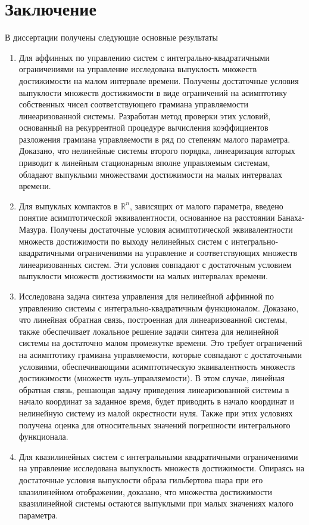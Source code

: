 \documentclass[../main.tex]{subfiles}
\begin{document}
\clearpage
\section*{Заключение}
В диссертации получены следующие основные результаты
\begin{enumerate}
	\item Для аффинных по управлению систем с интегрально-квадратичными ограничениями на управление исследована выпуклость множеств достижимости на малом интервале времени.
	Получены достаточные условия выпуклости множеств достижимости в виде ограничений на асимптотику собственных чисел соответствующего грамиана управляемости линеаризованной системы.
	Разработан метод проверки этих условий, основанный на рекуррентной процедуре вычисления коэффициентов разложения грамиана управляемости в ряд по степеням малого параметра.
	Доказано, что нелинейные системы второго порядка, линеаризация которых приводит к линейным стационарным вполне управляемым системам, обладают выпуклыми множествами достижимости на малых интервалах времени.
	
	\item Для выпуклых компактов в $\mathbb{R}^n$, зависящих от малого параметра, введено понятие асимптотической эквивалентности, основанное на расстоянии Банаха-Мазура.
	Получены достаточные условия асимптотической эквивалентности множеств достижимости по выходу нелинейных систем с интегрально-квадратичными ограничениями на управление и соответствующих множеств линеаризованных систем. 
	Эти условия совпадают с достаточным условием выпуклости множеств достижимости на малых интервалах времени.
	
	\item Исследована задача синтеза управления для нелинейной аффинной по управлению системы с интегрально-квадратичным функционалом. 
	Доказано, что линейная обратная связь, построенная для линеаризованной системы, также обеспечивает локальное решение задачи синтеза для нелинейной системы на достаточно малом промежутке времени. 
	Это требует ограничений на асимптотику грамиана управляемости, которые совпадают с достаточными условиями, обеспечивающими асимптотическую эквивалентность множеств достижимости (множеств нуль-управляемости). 
	В этом случае, линейная обратная связь, решающая задачу приведения линеаризованной системы в начало координат за заданное время, будет приводить в начало координат и нелинейную систему из малой окрестности нуля.
	Также при этих условиях получена оценка для относительных значений погрешности интегрального функционала. 
	
	\item Для квазилинейных систем с интегральными квадратичными ограничениями на управление исследована выпуклость множеств достижимости. 
	Опираясь на достаточные условия выпуклости образа гильбертова шара при его квазилинейном отображении, доказано, что множества достижимости квазилинейной системы остаются выпуклыми при малых значениях малого параметра. 
\end{enumerate}
\end{document}
